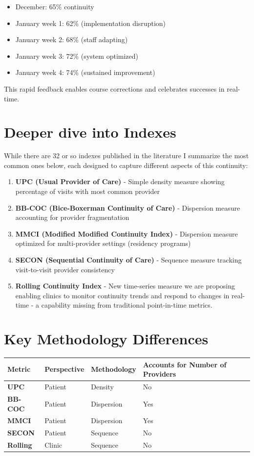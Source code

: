 \documentclass[11pt,a4paper]{article}
\begin{document}
\begin{itemize}
\item December: 65\% continuity
\item January week 1: 62\% (implementation disruption)
\item January week 2: 68\% (staff adapting)
\item January week 3: 72\% (system optimized)
\item January week 4: 74\% (sustained improvement)
\end{itemize}

This rapid feedback enables course corrections and celebrates successes in real-time.

\section{Deeper dive into Indexes}

While there are 32 or so indexes published in the literature I summarize the most common ones below, each designed to capture different aspects of this continuity:

\begin{enumerate}
\item \textbf{UPC (Usual Provider of Care)} - Simple density measure showing percentage of visits with most common provider
\item \textbf{BB-COC (Bice-Boxerman Continuity of Care)} - Dispersion measure accounting for provider fragmentation
\item \textbf{MMCI (Modified Modified Continuity Index)} - Dispersion measure optimized for multi-provider settings (residency programs)
\item \textbf{SECON (Sequential Continuity of Care)} - Sequence measure tracking visit-to-visit provider consistency
\item \textbf{Rolling Continuity Index} - New time-series measure we are proposing enabling clinics to monitor continuity trends and respond to changes in real-time - a capability missing from traditional point-in-time metrics.
\end{enumerate}


\section{Key Methodology Differences}

\begin{table}[h]
\centering
\begin{tabular}{llll}
\toprule
\textbf{Metric} & \textbf{Perspective} & \textbf{Methodology} & \textbf{Accounts for Number of Providers} \\
\midrule
\textbf{UPC} & Patient & Density & No \\
\textbf{BB-COC} & Patient & Dispersion & Yes \\
\textbf{MMCI} & Patient & Dispersion & Yes \\
\textbf{SECON} & Patient & Sequence & No \\
\textbf{Rolling} & Clinic & Sequence & No \\
\bottomrule
\end{tabular}
\end{table}
\end{document}
